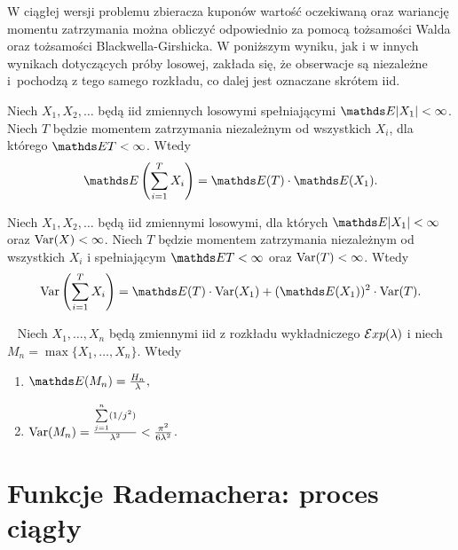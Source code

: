     

\noindent
W ciągłej wersji problemu zbieracza kuponów wartość oczekiwaną oraz wariancję momentu zatrzymania można obliczyć odpowiednio za pomocą tożsamości Walda oraz tożsamości Blackwella-Girshicka. W poniższym wyniku, jak i w innych wynikach dotyczących próby losowej, zakłada się, że obserwacje są niezależne i~pochodzą z tego samego rozkładu, co dalej jest oznaczane skrótem iid.



\begin{theorem}\label{thm:wald}
Niech $X_1,X_2,\ldots$ będą iid zmiennych losowymi spełniającymi $\EE|X_1|<\infty$. Niech $T$ będzie momentem zatrzymania niezależnym od wszystkich $X_i$, dla którego $\EE T<\infty$. Wtedy
$$
\EE\left(\sum\limits_{i=1}^T X_i\right) = \EE (T) \cdot \EE (X_1).
$$
\end{theorem}

\begin{theorem}
Niech $X_1,X_2,\ldots$ będą iid zmiennymi losowymi, dla których $\EE|X_1|<\infty$ oraz ${\rm{Var}}(X)<\infty$. Niech $T$ będzie momentem zatrzymania niezależnym od wszystkich $X_i$ i spełniającym $\EE T<\infty$ oraz ${\rm{Var}}(T)<\infty$. Wtedy
$$
{\rm{Var}}\left(\sum\limits_{i=1}^T X_i\right) = \EE (T) \cdot {\rm{Var}}(X_1) +  (\EE (X_1))^2 \cdot {\rm{Var}}(T).
$$
\end{theorem}



\begin{lemma}~\label{lem:maxexp}
\leavevmode
\makeatletter
\@nobreaktrue
\makeatother
Niech $X_1,\ldots,X_n$ będą zmiennymi iid z rozkładu wykładniczego $\mathcal{E}xp(\lambda)$ i niech $M_n = \max\{X_1,\ldots,X_n\}$. Wtedy
\begin{enumerate}
\item $\EE(M_n) = \frac{H_n}{\lambda},$
\item ${\rm Var}(M_n) = \frac{\sum\limits_{j=1}^{n} (1/j^2)}{\lambda^2} < \frac{\pi^2}{6\lambda^2}$.
\end{enumerate}
\end{lemma}



\section{Funkcje Rademachera: proces ciągły}\label{sec:rad}


